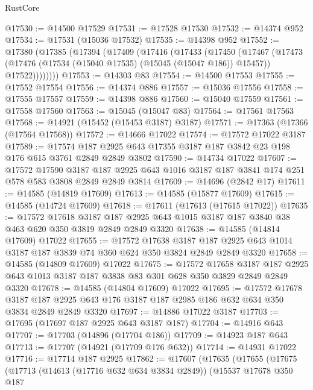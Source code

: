 \begin{lexlean}{RustCore}
\begin{coremodule}
@17530 := @14500 @17529
@17531 := @17528 @17530
@17532 := @14374 @952
@17534 := @17531 (@15036 @17532)
@17535 := @14398 @952
@17552 := @17380
    (@17385
      (@17394
        (@17409
          (@17416
            (@17433
              (@17450
                (@17467
                  (@17473
                    (@17476 (@17534 (@15040 @17535) (@15045 (@15047 @186)) @15457))
                    @17522))))))))
@17553 := @14303 @83
@17554 := @14500 @17553
@17555 := @17552 @17554
@17556 := @14374 @886
@17557 := @15036 @17556
@17558 := @17555 @17557
@17559 := @14398 @886
@17560 := @15040 @17559
@17561 := @17558 @17560
@17563 := @15045 (@15047 @83)
@17564 := @17561 @17563
@17568 := @14921 (@15452 (@15453 @3187) @3187)
@17571 := @17363 (@17366 (@17564 @17568))
@17572 := @14666 @17022
@17574 := @17572 @17022 @3187
@17589 := @17574 @187 @2925 @643 @17355 @3187 @187 @3842 @23 @198 @176 @615 @3761 @2849 @2849 @3802
@17590 := @14734 @17022
@17607 := @17572
    @17590
    @3187
    @187
    @2925
    @643
    @1016
    @3187
    @187
    @3841
    @174
    @251
    @578
    @583
    @3808
    @2849
    @2849
    @3814
@17609 := @14696 (@2842 @17)
@17611 := @14585 (@14819 @17609)
@17613 := @14585 (@15877 @17609)
@17615 := @14585 (@14724 @17609)
@17618 := @17611 (@17613 (@17615 @17022))
@17635 := @17572
    @17618
    @3187
    @187
    @2925
    @643
    @1015
    @3187
    @187
    @3840
    @38
    @463
    @620
    @350
    @3819
    @2849
    @2849
    @3320
@17638 := @14585 (@14814 @17609) @17022
@17655 := @17572
    @17638
    @3187
    @187
    @2925
    @643
    @1014
    @3187
    @187
    @3839
    @74
    @360
    @624
    @350
    @3824
    @2849
    @2849
    @3320
@17658 := @14585 (@14809 @17609) @17022
@17675 := @17572
    @17658
    @3187
    @187
    @2925
    @643
    @1013
    @3187
    @187
    @3838
    @83
    @301
    @628
    @350
    @3829
    @2849
    @2849
    @3320
@17678 := @14585 (@14804 @17609) @17022
@17695 := @17572
    @17678
    @3187
    @187
    @2925
    @643
    @176
    @3187
    @187
    @2985
    @186
    @632
    @634
    @350
    @3834
    @2849
    @2849
    @3320
@17697 := @14886 @17022 @3187
@17703 := @17695 (@17697 @187 @2925 @643 @3187 @187)
@17704 := @14916 @643
@17707 := @17703 (@14896 (@17704 @186))
@17709 := @14923 @187 @643
@17713 := @17707 (@14921 (@17709 @176 @632))
@17714 := @14931 @17022
@17716 := @17714 @187 @2925
@17862 := @17607
    (@17635
      (@17655
        (@17675
          (@17713
            (@14613 (@17716 @632 @634 @3834 @2849))
            (@15537
              @17678
              @350
              @187

\end{coremodule}
\end{lexlean}
